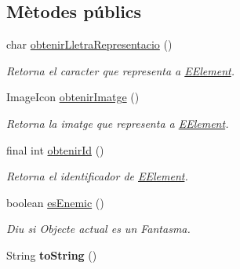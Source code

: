 \subsection*{Mètodes públics}
\begin{DoxyCompactItemize}
\item 
char \hyperlink{enumlogica_1_1enumeracions_1_1_e_element_a7a4bc5ca2a0a984a29cbc7bf9988d4aa}{obtenir\+Lletra\+Representacio} ()
\begin{DoxyCompactList}\small\item\em Retorna el caracter que representa a \hyperlink{enumlogica_1_1enumeracions_1_1_e_element}{E\+Element}. \end{DoxyCompactList}\item 
\hypertarget{enumlogica_1_1enumeracions_1_1_e_element_a9b55cc7b129ffff7c1c03aef465f32a7}{Image\+Icon \hyperlink{enumlogica_1_1enumeracions_1_1_e_element_a9b55cc7b129ffff7c1c03aef465f32a7}{obtenir\+Imatge} ()}\label{enumlogica_1_1enumeracions_1_1_e_element_a9b55cc7b129ffff7c1c03aef465f32a7}

\begin{DoxyCompactList}\small\item\em Retorna la imatge que representa a \hyperlink{enumlogica_1_1enumeracions_1_1_e_element}{E\+Element}. \end{DoxyCompactList}\item 
final int \hyperlink{enumlogica_1_1enumeracions_1_1_e_element_ace3c605008e8ec150845687493323df2}{obtenir\+Id} ()
\begin{DoxyCompactList}\small\item\em Retorna el identificador de \hyperlink{enumlogica_1_1enumeracions_1_1_e_element}{E\+Element}. \end{DoxyCompactList}\item 
boolean \hyperlink{enumlogica_1_1enumeracions_1_1_e_element_abac9b105a574e82ffaac64636c40b8e8}{es\+Enemic} ()
\begin{DoxyCompactList}\small\item\em Diu si Objecte actual es un Fantasma. \end{DoxyCompactList}\item 
\hypertarget{enumlogica_1_1enumeracions_1_1_e_element_a8f501522d71ec7107069a9f2d8faeb8b}{String {\bfseries to\+String} ()}\label{enumlogica_1_1enumeracions_1_1_e_element_a8f501522d71ec7107069a9f2d8faeb8b}

\end{DoxyCompactItemize}
